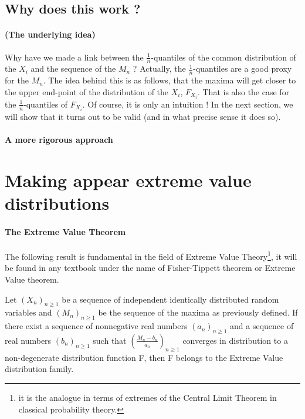 \subsection{Why does this work ?}
\paragraph{(The underlying idea)}
Why have we made a link between the $\frac{1}{n}$-quantiles of the common distribution of the $X_i$ and the sequence of the $M_n$ ? Actually, the $\frac{1}{n}$-quantiles are a good proxy for the $M_n$. \newline
The idea behind this is as follows, that the maxima will get closer to the upper end-point of the distribution of the $X_i$, $F_{X_i}$. That is also the case for the $\frac{1}{n}$-quantiles of $F_{X_i}$. Of course, it is only an intuition ! In the next section, we will show that it turns out to be valid (and in what precise sense it does so).
\paragraph{A more rigorous approach}
\section{Making appear extreme value distributions}
\paragraph{The Extreme Value Theorem} The following result is fundamental in the field of Extreme Value Theory\footnote{it is the analogue in terms of extremes of the Central Limit Theorem in classical probability theory.}, it will be found in any textbook under the name of Fisher-Tippett theorem or Extreme Value theorem. \\ [4 pt]
\begin{framed}
	Let $(X_n)_{n \ge 1}$ be a sequence of independent identically distributed random variables and $(M_n)_{n \ge 1}$ be the sequence of the maxima as previously defined. If there exist a sequence of nonnegative real numbers $(a_n)_{n \ge 1}$ and a sequence of real numbers $(b_n)_{n \ge 1}$ such that $(\frac{M_n - b_n}{a_n})_{n \ge 1}$ converges in distribution to a non-degenerate distribution function F, then F belongs to the Extreme Value distribution family.
\end{framed}
